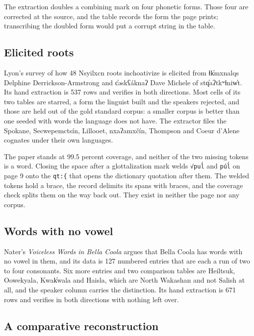 The extraction doubles a combining mark on four phonetic forms. Those four are corrected at the source, and the table records the form the page prints; transcribing the doubled form would put a corrupt string in the table.

\subsection{Elicited roots}

Lyon's survey of how 48 Nsyilxcn roots inchoativize \cite{src:Lyon-2025} is elicited from ɬk̓mxnalqs Delphine Derrickson-Armstrong and c̓əskʕáknaʔ Dave Michele of stq̓aʔtkʷɬniw̓t. Its hand extraction is 537 rows and verifies in both directions. Most cells of its two tables are starred, a form the linguist built and the speakers rejected, and those are held out of the gold standard corpus: a smaller corpus is better than one seeded with words the language does not have. The extractor files the Spokane, Secwepemctsín, Lillooet, nxaʔamxčín, Thompson and Coeur d'Alene cognates under their own languages.

The paper stands at 99.5 percent coverage, and neither of the two missing tokens is a word. Closing the space after a glottalization mark welds \texttt{√pul̕} and \texttt{púl̕} on page 9 onto the \texttt{qt:\{} that opens the dictionary quotation after them. The welded tokens hold a brace, the record delimits its spans with braces, and the coverage check splits them on the way back out. They exist in neither the page nor any corpus.

\subsection{Words with no vowel}

Nater's \emph{Voiceless Words in Bella Coola} \cite{src:Nater-2024} argues that Bella Coola has words with no vowel in them, and its data is 127 numbered entries that are each a run of two to four consonants. Six more entries and two comparison tables are Heiltsuk, Oowekyala, Kwak̓wala and Haisla, which are North Wakashan and not Salish at all, and the speaker column carries the distinction. Its hand extraction is 671 rows and verifies in both directions with nothing left over.

\subsection{A comparative reconstruction}

